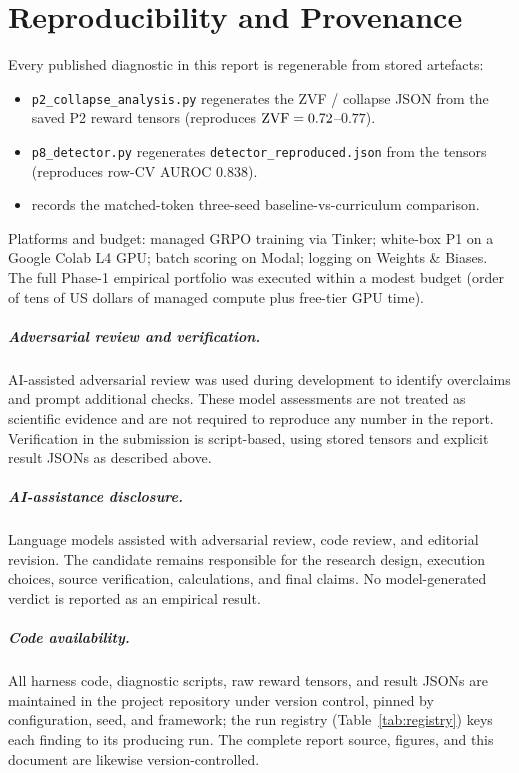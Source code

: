 \chapter{Reproducibility and Provenance}
\label{app:repro}
Every published diagnostic in this report is regenerable from stored artefacts:
\begin{itemize}[leftmargin=1.4em,itemsep=1pt]
  \item \texttt{p2\_collapse\_analysis.py} regenerates the ZVF / collapse JSON from
  the saved P2 reward tensors (reproduces $\mathrm{ZVF}=0.72$--$0.77$).
  \item \texttt{p8\_detector.py} regenerates \texttt{detector\_reproduced.json} from
  the  tensors (reproduces row-CV AUROC $0.838$).
  \item {} records the matched-token
  three-seed baseline-vs-curriculum comparison.
\end{itemize}
Platforms and budget: managed GRPO training via Tinker; white-box P1 on a Google
Colab L4 GPU; batch scoring on Modal; logging on Weights \& Biases. The full
Phase-1 empirical portfolio was executed within a modest budget (order of tens of
US dollars of managed compute plus free-tier GPU time).

\paragraph{Adversarial review and verification.} AI-assisted adversarial review was
used during development to identify overclaims and prompt additional checks. These
model assessments are not treated as scientific evidence and are not required to
reproduce any number in the report. Verification in the submission is script-based,
using stored tensors and explicit result JSONs as described above.

\paragraph{AI-assistance disclosure.} Language models assisted with adversarial
review, code review, and editorial revision. The candidate remains responsible for
the research design, execution choices, source verification, calculations, and final
claims. No model-generated verdict is reported as an empirical result.

\paragraph{Code availability.} All harness code, diagnostic scripts, raw reward tensors,
and result JSONs are maintained in the project repository under version control, pinned
by configuration, seed, and framework; the run registry (Table~\ref{tab:registry}) keys
each finding to its producing run. The complete report source, figures, and this
document are likewise version-controlled.

